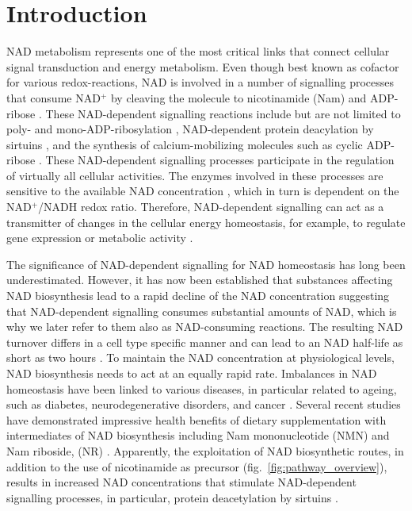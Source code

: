 
\section{Introduction}

NAD metabolism represents one of the most critical links that connect cellular signal transduction and energy metabolism. Even though best known as cofactor for various redox-reactions, NAD is involved in a number of signalling processes that consume NAD$^{+}$ by cleaving the molecule to nicotinamide (Nam) and ADP-ribose \cite{Verdin2015}. These NAD-dependent signalling reactions include but are not limited to poly- and mono-ADP-ribosylation \cite{Butepage2015,DeVos2012}, NAD-dependent protein deacylation by sirtuins \cite{Osborne2016}, and the synthesis of calcium-mobilizing molecules such as cyclic ADP-ribose \cite{Lee2012}. These NAD-dependent signalling processes participate in the regulation of virtually all cellular activities. The enzymes involved in these processes are sensitive to the available NAD concentration \cite{Ruggieri2015}, which in turn is dependent on the NAD$^{+}$/NADH redox ratio. Therefore, NAD-dependent signalling can act as a transmitter of changes in the cellular energy homeostasis, for example, to regulate gene expression or metabolic activity \cite{Koch-Nolte2009}.

The significance of NAD-dependent signalling for NAD homeostasis has long been underestimated. However, it has now been established that substances affecting NAD biosynthesis lead to a rapid decline of the NAD concentration \cite{Buonvicino2018} suggesting that NAD-dependent signalling consumes substantial amounts of NAD, which is why we later refer to them also as NAD-consuming reactions. The resulting NAD turnover differs in a cell type specific manner and can lead to an NAD half-life as short as two hours \cite{Liu2018}. To maintain the NAD concentration at physiological levels, NAD biosynthesis needs to act at an equally rapid rate. Imbalances in NAD homeostasis have been linked to various diseases, in particular related to ageing, such as diabetes, neurodegenerative disorders, and cancer \cite{Chiarugi2012,Verdin2015}. Several recent studies have demonstrated impressive health benefits of dietary supplementation with intermediates of NAD biosynthesis including Nam mononucleotide (NMN) and Nam riboside, (NR) \cite{Yoshino2018}. Apparently, the exploitation of NAD biosynthetic routes, in addition to the use of nicotinamide as precursor (fig.~\ref{fig:pathway_overview}), results in increased NAD concentrations that stimulate NAD-dependent signalling processes, in particular, protein deacetylation by sirtuins \cite{North2004}.


